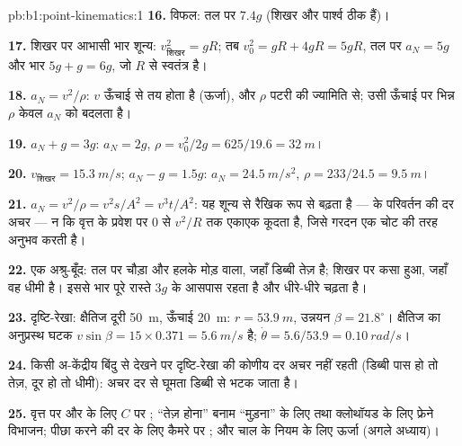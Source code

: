 \begin{solution}{pb:b1:point-kinematics:1}
\textbf{16.} विफल: तल पर $7.4g$ (शिखर और पार्श्व ठीक हैं)।

\textbf{17.} शिखर पर आभासी भार शून्य: $v_{\text{शिखर}}^2 = gR$;
तब $v_0^2 = gR + 4gR = 5gR$, तल पर $a_N = 5g$ और भार
$5g + g = 6g$, जो $R$ से स्वतंत्र है।

\textbf{18.} $a_N = v^2/\rho$: $v$ ऊँचाई से तय होता है (ऊर्जा), और $\rho$
पटरी की ज्यामिति से; उसी ऊँचाई पर भिन्न $\rho$ केवल $a_N$ को बदलता है।

\textbf{19.} $a_N + g = 3g$: $a_N = 2g$, $\rho = v_0^2/2g = 625/19.6 =
\qty{32}{m}$।

\textbf{20.} $v_{\text{शिखर}} = \qty{15.3}{m/s}$; $a_N - g = 1.5g$: $a_N =
\qty{24.5}{m/s^2}$, $\rho = 233/24.5 = \qty{9.5}{m}$।

\textbf{21.} $a_N = v^2/\rho = v^2s/A^2 = v^3t/A^2$: यह शून्य से रैखिक रूप
से बढ़ता है ---  के परिवर्तन की दर अचर --- न कि वृत्त के प्रवेश पर
$0$ से $v^2/R$ तक एकाएक कूदता है, जिसे गरदन एक चोट की तरह अनुभव करती है।

\textbf{22.} एक अश्रु-बूँद: तल पर चौड़ा और हलके मोड़ वाला, जहाँ डिब्बी तेज़
है; शिखर पर कसा हुआ, जहाँ वह धीमी है। इससे भार पूरे रास्ते $3g$ के आसपास
रहता है और धीरे-धीरे चढ़ता है।

\textbf{23.} दृष्टि-रेखा: क्षैतिज दूरी \qty{50}{m}, ऊँचाई
\qty{20}{m}: $r = \qty{53.9}{m}$, उन्नयन $\beta = 21.8^\circ$। क्षैतिज 
का अनुप्रस्थ घटक $v\sin\beta = 15 \times
0.371 = \qty{5.6}{m/s}$ है; $\dot\theta = 5.6/53.9 = \qty{0.10}{rad/s}$।

\textbf{24.} किसी अ-केंद्रीय बिंदु से देखने पर दृष्टि-रेखा की कोणीय दर अचर
नहीं रहती (डिब्बी पास हो तो तेज़, दूर हो तो धीमी): अचर दर से घूमता 
डिब्बी से भटक जाता है।

\textbf{25.} वृत्त पर  और  के लिए $C$ पर ;
``तेज़ होना'' बनाम ``मुड़ना'' के लिए तथा क्लोथॉयड के लिए फ्रेने विभाजन;
पीछा करने की दर के लिए कैमरे पर ; और चाल के नियम के लिए
ऊर्जा (अगले अध्याय)।
\end{solution}
